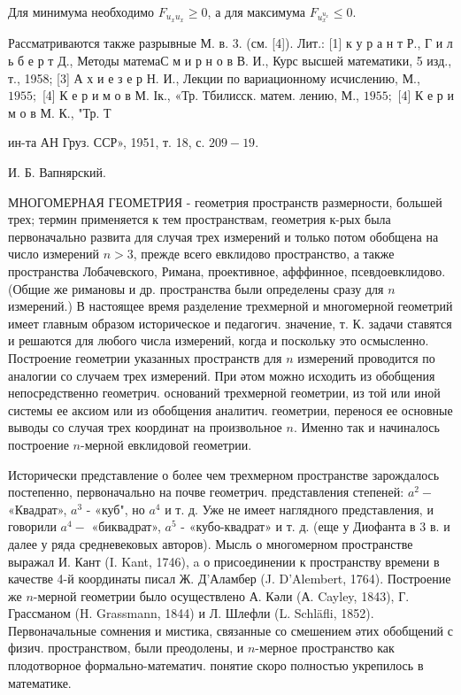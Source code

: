 \documentclass[10pt]{article}
\begin{document}
Для минимума необходимо $F_{u_{x} u_{x}} \geqslant 0$, а для максимума $F_{u_{x}^{u_{x}}} \leqslant 0$.



Рассматриваются также разрывные М. в. 3. (см. [4]). Лит.: [1] к у р а н т Р., Г и л ь б е р т Д., Методы матемаС м и р н о в В. И., Курс высшей математики, 5 изд., т., 1958; [3] А х и е з е р Н. И., Лекции по вариационному исчислению, М., $1955 ;$ [4] К е р и м о в М. Ік., «Тр. Тбилисск. матем. лению, М., $1955 ;$ [4] К е р и м о в М. К., "Тр. Т

ин-та АН Груз. ССР», 1951, т. 18, с. $209-19$.



И. Б. Вапнярский.



МНОГОМЕРНАЯ ГЕОМЕТРИЯ - геометрия пространств размерности, большей трех; термин применяется к тем пространствам, геометрия к-рых была первоначально развита для случая трех измерений и только потом обобщена на число измерений $n>3$, прежде всего евклидово пространство, а также пространства Лобачевского, Римана, проективное, афффинное, псевдоевклидово. (Общие же римановы и др. пространства были определены сразу для $n$ измерений.) В настоящее время разделение трехмерной и многомерной геометрий имеет главным образом историческое и педагогич. значение, т. К. задачи ставятся и решаются для любого числа измерений, когда и поскольку это осмысленно. Построение геометрии указанных пространств для $n$ измерений проводится по аналогии со случаем трех измерений. При әтом можно исходить из обобщения непосредственно геометрич. оснований трехмерной геометрии, из той или иной системы ее аксиом или из обобщения аналитич. геометрии, перенося ее основные выводы со случая трех координат на произвольное $n$. Именно так и начиналось построение $n$-мерной евклидовой геометрии.



Исторически представление о более чем трехмерном пространстве зарождалось постепенно, первоначально на почве геометрич. представления степеней: $a^{2}-$ «Квадрат», $a^{3}$ - «куб", но $a^{4}$ и т. д. Уже не имеет наглядного представления, и говорили $a^{4}-$ «биквадрат», $a^{5}$ - «кубо-квадрат» и т. д. (еще у Диофанта в 3 в. и далее у ряда средневековых авторов). Мысль о многомерном пространстве выражал И. Кант (I. Kant, 1746), a о присоединении к пространству времени в качестве 4-й координаты писал Ж. Д'Аламбер (J. D'Alembert, 1764). Построение же $n$-мерной геометрии было осуществлено А. Кәли (А. Cayley, 1843), Г. Грассманом (H. Grassmann, 1844) и Л. Шлефли (L. Schläfli, 1852). Первоначальные сомнения и мистика, связанные со смешением әтих обобщений с физич. пространством, были преодолены, и $n$-мерное пространство как плодотворное формально-математич. понятие скоро полностью укрепилось в математике.
\end{document}
